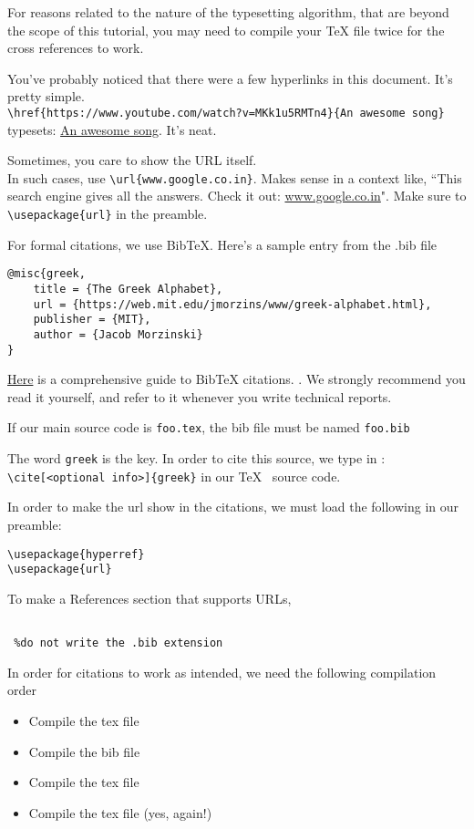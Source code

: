 \documentclass[12pt, letterpaper]{article}
\theoremstyle{remark}
\begin{document}
For reasons related to the nature of the typesetting algorithm, that are beyond the scope of this tutorial, you may need to compile your \TeX{} file twice for the cross references to work.

You've probably noticed that there were a few hyperlinks in this document. It's pretty simple. \\ \verb!\href{https://www.youtube.com/watch?v=MKk1u5RMTn4}{An awesome song}! typesets: \href{https://www.youtube.com/watch?v=MKk1u5RMTn4}{An awesome song}. 
It's neat. 

Sometimes, you care to show the URL itself.\\ 
In such cases, use \verb!\url{www.google.co.in}!. Makes sense in a context like, ``This search engine gives all the answers. Check it out: \url{www.google.co.in}". Make sure to \verb!\usepackage{url}! in the preamble.

For formal citations, we use BibTeX. Here's a sample entry from the .bib file
\begin{verbatim}
@misc{greek,
	title = {The Greek Alphabet},
	url = {https://web.mit.edu/jmorzins/www/greek-alphabet.html},
	publisher = {MIT},
	author = {Jacob Morzinski}
}
\end{verbatim}

\href{http://web.mit.edu/rsi/www/pdfs/bibtex-format.pdf}{Here} is a comprehensive guide to BibTeX citations. \cite{bibtex}. We strongly recommend you read it yourself, and refer to it whenever you write technical reports. 

If our main source code is \verb!foo.tex!, the bib file must be named \verb!foo.bib!

The word \verb!greek! is the key. In order to cite this source, we type in :\\
\verb!\cite[<optional info>]{greek}! in our \TeX~ source code.

In order to make the url show in the citations, we must load the following in our preamble:
\begin{lstlisting}
\usepackage{hyperref}
\usepackage{url}
\end{lstlisting}

To make a References section that supports URLs, 
\begin{lstlisting}

 %do not write the .bib extension
\end{lstlisting}

In order for citations to work as intended, we need the following compilation order
\begin{itemize}
\item Compile the tex file
\item Compile the bib file
\item Compile the tex file
\item Compile the tex file (yes, again!)
\end{itemize}
\end{document}
